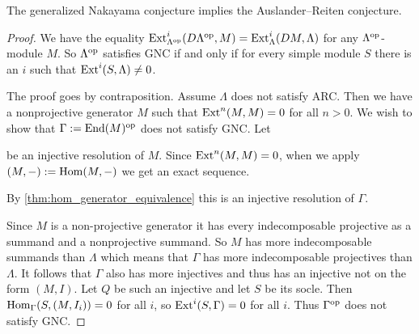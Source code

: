 \begin{theorem}\label{thm:GNC_implies_ARC}
	The generalized Nakayama conjecture implies the Auslander--Reiten conjecture.
	\begin{proof}
		We have the equality $\operatorname{Ext}^i_{\Lambda^{\operatorname{op}}}(D{\Lambda^{\operatorname{op}}}, M) = \operatorname{Ext}^i_\Lambda(DM, \Lambda)$ for any ${\Lambda^{\operatorname{op}}}$-module $M$. So ${\Lambda^{\operatorname{op}}}$ satisfies GNC if and only if for every simple module $S$ there is an $i$ such that $\operatorname{Ext}^i(S, \Lambda) \neq 0$.
		
		The proof goes by contraposition. Assume $\Lambda$ does not satisfy ARC. Then we have a nonprojective generator $M$ such that $\operatorname{Ext}^n(M, M)=0$ for all $n>0$. We wish to show that $\Gamma := \operatorname{End}(M)^{\operatorname{op}}$ does not satisfy GNC. Let
		\begin{center}
		\end{center}
		be an injective resolution of $M$. Since $\operatorname{Ext}^n(M,M)=0$, when we apply $(M,-):=\operatorname{Hom}(M,-)$ we get an exact sequence.
		\begin{center}
		\end{center}
		By \cref{thm:hom_generator_equivalence} this is an injective resolution of $\Gamma$.
		
		Since $M$ is a non-projective generator it has every indecomposable projective as a summand and a nonprojective summand. So $M$ has more indecomposable summands than $\Lambda$ which means that $\Gamma$ has more indecomposable projectives than $\Lambda$. It follows that $\Gamma$ also has more injectives and thus has an injective not on the form $(M, I)$. Let $Q$ be such an injective and let $S$ be its socle. Then $\operatorname{Hom}_\Gamma(S, (M, I_i)) = 0$ for all $i$, so $\operatorname{Ext}^i(S, \Gamma) = 0$ for all $i$. Thus $\Gamma^{\operatorname{op}}$ does not satisfy GNC.
	\end{proof}
\end{theorem}

